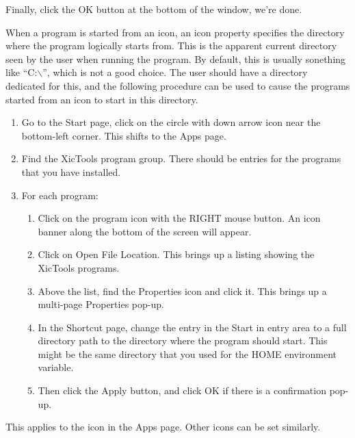 Finally, click the {\cb OK} button at the bottom of the window, we're
done.

When a program is started from an icon, an icon property specifies the
directory where the program logically starts from.  This is the
apparent current directory seen by the user when running the program. 
By default, this is usually sonething like ``{\vt C:$\backslash$}'',
which is not a good choice.  The user should have a directory
dedicated for this, and the following procedure can be used to cause
the programs started from an icon to start in this directory.

\begin{enumerate}
\item{Go to the {\cb Start} page, click on the circle with down arrow
icon near the bottom-left corner.  This shifts to the {\cb Apps} page.}

\item{Find the {\cb XicTools} program group.  There should be entries
for the programs that you have installed.}

\item{For each program:\\
\begin{enumerate}
  \item{Click on the program icon with the RIGHT mouse button.  An
  icon banner along the bottom of the screen will appear.}

  \item{Click on {\cb Open File Location}.  This brings up a listing
  showing the {\cb XicTools} programs.}

  \item{Above the list, find the {\cb Properties} icon and click it. 
  This brings up a multi-page {\cb Properties} pop-up.}

  \item{In the {\cb Shortcut} page, change the entry in the {\cb Start
  in} entry area to a full directory path to the directory where the
  program should start.  This might be the same directory that you
  used for the {\vt HOME} environment variable.}

  \item{Then click the {\cb Apply} button, and click {\cb OK} if there
  is a confirmation pop-up.}
\end{enumerate}
}
\end{enumerate}

This applies to the icon in the {\cb Apps} page.  Other icons can be
set similarly.


